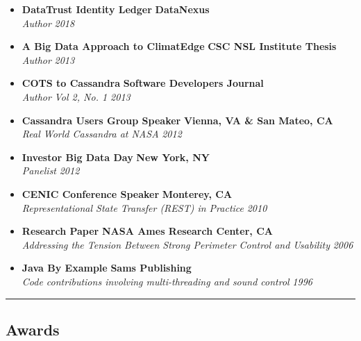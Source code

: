 \begin{itemize}
    \parskip=0.1em
    \item
    \headerrow
        {\textbf{DataTrust Identity Ledger}}
        {\textbf{DataNexus}}
    \\
    \headerrow
        {\emph{Author}}
        {\emph{2018}}
    \item
    \headerrow
        {\textbf{A Big Data Approach to ClimatEdge\texttrademark}}
        {\textbf{CSC NSL Institute Thesis}}
    \\
    \headerrow
        {\emph{Author}}
        {\emph{2013}}
    \item
	\headerrow
		{\textbf{COTS to Cassandra}}
		{\textbf{Software Developers Journal}}
	\\
	\headerrow
		{\emph{Author}}
		{\emph{Vol 2, No. 1 2013}}
    \item
	\headerrow
		{\textbf{Cassandra Users Group Speaker}}
		{\textbf{Vienna, VA \& San Mateo, CA}}
	\\
	\headerrow
		{\emph{Real World Cassandra at NASA}}
		{\emph{2012}}
	\item
	\headerrow
		{\textbf{Investor Big Data Day}}
		{\textbf{New York, NY}}
	\\
	\headerrow
		{\emph{Panelist}}
		{\emph{2012}}
	\item
    \headerrow
		{\textbf{CENIC Conference Speaker}}
		{\textbf{Monterey, CA}}
	\\
	\headerrow
		{\emph{Representational State Transfer (REST) in Practice}}
		{\emph{2010}}
	\item
	\headerrow
		{\textbf{Research Paper}}
		{\textbf{NASA Ames Research Center, CA}}
	\\
	\headerrow
		{\emph{Addressing the Tension Between Strong Perimeter Control and Usability}}
		{\emph{2006}}
	\item
	\headerrow
		{\textbf{Java By Example}}
		{\textbf{Sams Publishing}}
	\\
	\headerrow
		{\emph{Code contributions involving multi-threading and sound control}}
		{\emph{1996}}
\end{itemize}

\hrule
\vspace{-0.4em}
\subsection*{Awards}

